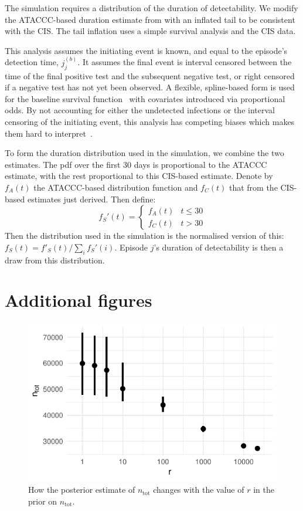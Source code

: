 \documentclass[referee,useAMS,usenatbib]{biom}
\newcommand{\ntot}{n_\text{tot}}
\begin{document}
The simulation requires a distribution of the duration of detectability.
We modify the ATACCC-based duration estimate from \citet[chapter 4]{blakeThesis} with an inflated tail to be consistent with the CIS.
The tail inflation uses a simple survival analysis and the CIS data.

This analysis assumes the initiating event is known, and equal to the episode’s detection time, $j_j^{(b)}$.
It assumes the final event is interval censored between the time of the final positive test and the subsequent negative test, or right censored if a negative test has not yet been observed.
A flexible, spline-based form is used for the baseline survival function~\citep{roystonSTPM,roystonFlexible} with covariates introduced via proportional odds.
By not accounting for either the undetected infections or the interval censoring of the initiating event, this analysis has competing biases which makes them hard to interpret~\citep{cisMethodsONS}.

To form the duration distribution used in the simulation, we combine the two estimates.
The pdf over the first 30 days is proportional to the ATACCC estimate, with the rest proportional to this CIS-based estimate.
Denote by $f_A(t)$ the ATACCC-based distribution function and $f_C(t)$ that from the CIS-based estimates just derived.
Then define:
$$
f_S'(t) = \begin{cases}
	f_A(t) &t \leq 30 \\
	f_C(t) &t > 30
\end{cases}
$$
Then the distribution used in the simulation is the normalised version of this: $f_S(t) = f'_S(t)/\sum_i f_S'(i)$.
Episode $j$'s duration of detectability is then a draw from this distribution.

\section{Additional figures}

\begin{figure}
  \includegraphics{figures/output/CIS_ntot}
  \caption[Sensitivity of $\ntot$'s posterior to its prior.]{How the posterior estimate of $\ntot$ changes with the value of $r$ in the prior on $\ntot$.}
  \label{imperf-test:fig:ntot}
\end{figure}




\end{document}
